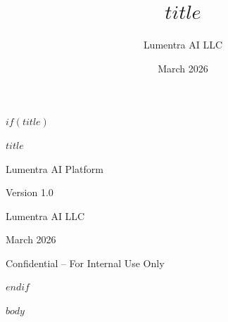 \documentclass[11pt,a4paper]{article}
\title{\Huge\bfseries $title$}
\author{Lumentra AI LLC}
\date{March 2026}
\begin{document}
$if(title)$
\begin{titlepage}
\centering
\vspace*{3cm}
{\Huge\bfseries $title$\par}
\vspace{1.5cm}
{\Large Lumentra AI Platform\par}
\vspace{1cm}
{\large Version 1.0\par}
\vspace{2cm}
{\large Lumentra AI LLC\par}
\vspace{0.5cm}
{\large March 2026\par}
\vfill
{\small Confidential -- For Internal Use Only\par}
\end{titlepage}
$endif$

\tableofcontents
\newpage

$body$
\end{document}

